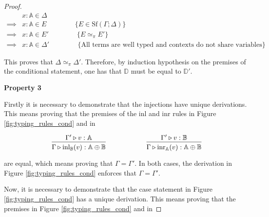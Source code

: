 \documentclass[10pt,a4paper]{amsart}
\theoremstyle{definition}
\theoremstyle{definition}
\theoremstyle{definition}
\theoremstyle{definition}
\theoremstyle{definition}
\theoremstyle{definition}
\begin{document}
\begin{proof}
\begin{align*}
  & x: \mathbb{A}  \in \Delta & \\
  \implies & x: \mathbb{A}  \in E \hspace{50pt} \{E \in \text{Sf}(\Gamma;\Delta)\} \\
  \implies & x: \mathbb{A} \in E' \hspace{50pt} \{ E \simeq_{\pi} E' \}  \\
  \implies & x: \mathbb{A}  \in \Delta' \hspace{50pt} \{\text{All terms are well typed and contexts do not share variables}\}
\end{align*}

This proves that $\Delta \simeq_{\pi} \Delta'$. Therefore, by induction hypothesis on the premises of the conditional statement, one has that $\mathbb{D}$ must be equal to $\mathbb{D}'$.
  

\vspace{10pt}
    \textbf{Property 3}

    Firstly it is necessary to demonstrate that the injections have unique derivations. This means proving that the premises of the inl and inr rules in Figure \ref{fig:typing_rules_cond} and in
\begin{figure} [H]
  \begin{equation*}
  \begin{aligned}
    &
    \begin{prooftree}
    \hypo{\Gamma' \triangleright v: \mathbb{A}}
    \infer1[]{\Gamma \triangleright \text{inl}_{\mathbb{B}}(v): \mathbb{A} \oplus \mathbb{B}}
    \end{prooftree}
    \hspace{60pt}
    \begin{prooftree}
    \hypo{\Gamma' \triangleright v: \mathbb{B}}
    \infer1[]{\Gamma \triangleright \text{inr}_{\mathbb{A}}(v): \mathbb{A} \oplus \mathbb{B}}
    \end{prooftree} \\
  \end{aligned}
  \end{equation*}
  \end{figure}

are equal, which means proving that $\Gamma = \Gamma'$. In both cases, the derivation in Figure \ref{fig:typing_rules_cond} enforces that $\Gamma = \Gamma'$.

Now, it is necessary to demonstrate that the case statement in Figure \ref{fig:typing_rules_cond} has a unique derivation. This means proving that the premises in Figure \ref{fig:typing_rules_cond} and in


\end{proof}
\end{document}
